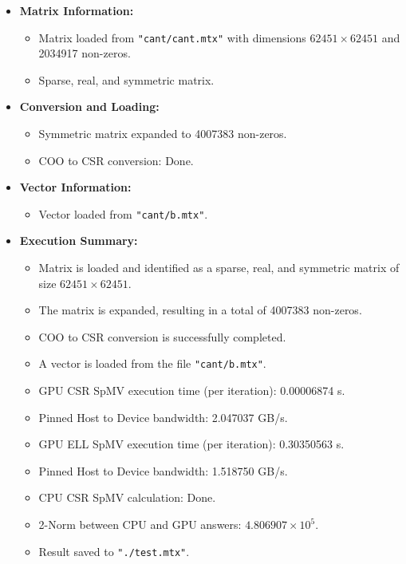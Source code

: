 \documentclass[11pt, twocolumn]{article}
\begin{document}
\begin{itemize}
  \item \textbf{Matrix Information:}
    \begin{itemize}
      \item Matrix loaded from \texttt{"cant/cant.mtx"} with dimensions $62451 \times 62451$ and 2034917 non-zeros.
      \item Sparse, real, and symmetric matrix.
    \end{itemize}
  
  \item \textbf{Conversion and Loading:}
    \begin{itemize}
      \item Symmetric matrix expanded to 4007383 non-zeros.
      \item COO to CSR conversion: Done.
    \end{itemize}
  
  \item \textbf{Vector Information:}
    \begin{itemize}
      \item Vector loaded from \texttt{"cant/b.mtx"}.
    \end{itemize}
  
  \item \textbf{Execution Summary:}
    \begin{itemize}
      \item Matrix is loaded and identified as a sparse, real, and symmetric matrix of size $62451 \times 62451$.
      \item The matrix is expanded, resulting in a total of 4007383 non-zeros.
      \item COO to CSR conversion is successfully completed.
      \item A vector is loaded from the file \texttt{"cant/b.mtx"}.
      \item GPU CSR SpMV execution time (per iteration): 0.00006874 s.
      \item Pinned Host to Device bandwidth: 2.047037 GB/s.
      \item GPU ELL SpMV execution time (per iteration): 0.30350563 s.
      \item Pinned Host to Device bandwidth: 1.518750 GB/s.
      \item CPU CSR SpMV calculation: Done.
      \item 2-Norm between CPU and GPU answers: $4.806907 \times 10^5$.
      \item Result saved to \texttt{"./test.mtx"}.
    \end{itemize}
\end{itemize}
\end{document}
